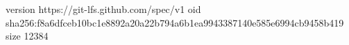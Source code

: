 version https://git-lfs.github.com/spec/v1
oid sha256:f8a6dfceb10bc1e8892a20a22b794a6b1ea9943387140e585e6994cb9458b419
size 12384
